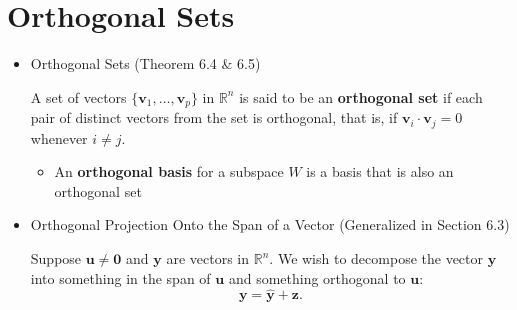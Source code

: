 \documentclass[10pt]{book}
\newenvironment{boxdef}{\begin{mdframed}[backgroundcolor=gray!30,linewidth=0pt,nobreak=true]}{\end{mdframed}}
\newcommand{\R}{\mathbb{R}}
\newcommand{\vect}[1]{\ensuremath{\boldsymbol{\mathbf{#1}}}}
\newcommand{\vectsetvp}{\{\vect{v}_1,\ldots,\vect{v}_p\}}
\newcommand{\yhat}{\hat{\vect{y}}}
\begin{document}
\newpage


\section{Orthogonal Sets}

\begin{itemize}
	\item Orthogonal Sets (Theorem 6.4 \& 6.5)
	\begin{boxdef}
		A set of vectors $\vectsetvp$ in $\R^n$ is said to be an \textbf{orthogonal set} if each pair of distinct vectors from the set is orthogonal, that is, if $\vect{v}_i\cdot\vect{v}_j=0$ whenever $i\neq j$.
	\end{boxdef}
	\begin{itemize}
		\item An \textbf{orthogonal basis} for a subspace $W$ is a basis that is also an orthogonal set
	\end{itemize}
	\item Orthogonal Projection Onto the Span of a Vector (Generalized in Section 6.3)
	\begin{boxdef}
		\begin{multicols}{2}
			Suppose $\vect{u}\neq\vect{0}$ and $\vect{y}$ are vectors in $\R^n$. We wish to decompose the vector $\vect{y}$ into something in the span of $\vect{u}$ and something orthogonal to $\vect{u}$:
			$$ \vect{y} = \yhat + \vect{z}. $$
			
			\columnbreak
			

\end{multicols}
\end{boxdef}
\end{itemize}
\end{document}
